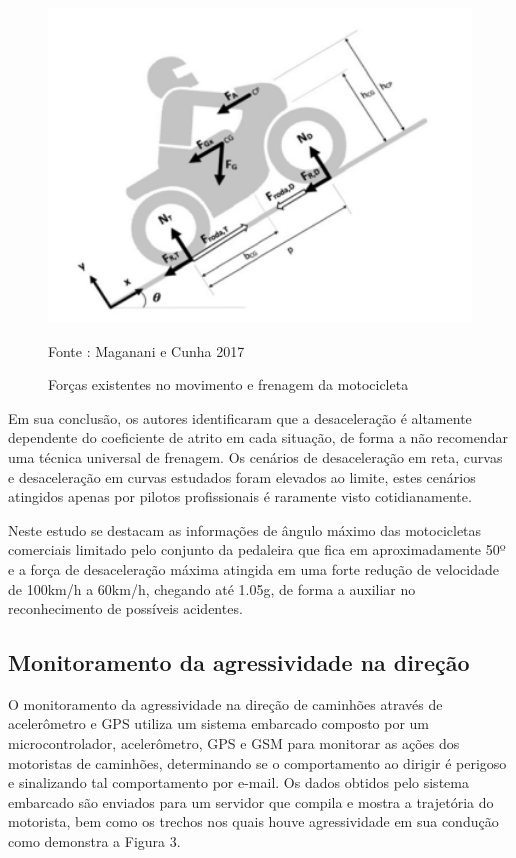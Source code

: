     
 \begin{figure}[H] 

 \caption{Forças existentes no movimento e frenagem da motocicleta}

  \includegraphics[width=150mm]{images/Cap2/forca.png}

    \scriptsize  Fonte : Maganani e Cunha 2017
  \end{figure}

    

 
  
  Em sua conclusão, os autores identificaram que a desaceleração é altamente dependente do coeficiente de atrito em cada situação, de forma a não recomendar uma técnica universal de frenagem. Os cenários de desaceleração em reta, curvas e desaceleração em curvas estudados foram elevados ao limite, estes cenários atingidos apenas por pilotos profissionais é raramente visto cotidianamente. 

Neste estudo se destacam as informações de ângulo máximo das motocicletas comerciais limitado pelo conjunto da pedaleira que fica em aproximadamente 50º e a força de desaceleração máxima atingida em uma forte redução de velocidade de 100km/h a 60km/h, chegando até 1.05g, de forma a auxiliar no reconhecimento de possíveis acidentes. 




\subsection{\textbf{Monitoramento da agressividade na direção}}


O monitoramento da agressividade na direção de caminhões através de acelerômetro e GPS  utiliza um sistema embarcado composto por um microcontrolador, acelerômetro, GPS e GSM para monitorar as ações dos motoristas de caminhões, determinando se o comportamento ao dirigir é perigoso e sinalizando tal comportamento por e-mail. Os dados obtidos pelo sistema embarcado são enviados para um servidor que compila e mostra a trajetória do motorista, bem como os trechos nos quais houve agressividade em sua condução como demonstra a Figura 3.



